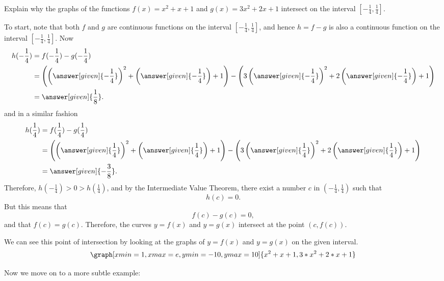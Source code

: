 \documentclass{ximera}
\begin{document}
\begin{example}
  Explain why the graphs of the functions $f(x) = x^2+x+1$  and $ g(x) = 3x^2+2x+1$ intersect on the interval $[-\frac14,\frac14]$.

  To start, note that both $f$ and $g$ are continuous functions on the interval $[-\frac14,\frac14]$, and
  hence $h = f-g$ is also a continuous function on the interval $[-\frac14,\frac14]$. Now
  \begin{align*}
    h(-\frac14) &= f(-\frac14) - g(-\frac14) \\
    &= \left(\left(\answer[given]{-\frac14}\right)^2 + \left(\answer[given]{-\frac14}\right)+1\right)
      - \left( 3\left(\answer[given]{-\frac14}\right)^2+2\left(\answer[given]{-\frac14}\right)+1 \right)\\
    &= \answer[given]{\frac18}.
  \end{align*}
  and in a similar fashion
  \begin{align*}
    h(\frac14) &= f(\frac14) - g(\frac14) \\
    &= \left(\left(\answer[given]{\frac14}\right)^2 + \left(\answer[given]{\frac14}\right)+1\right)
      - \left( 3\left(\answer[given]{\frac14}\right)^2+2\left(\answer[given]{\frac14}\right)+1 \right)\\
    &= \answer[given]{-\frac38}.
  \end{align*}
   Therefore, $h(-\frac14)>0>h(\frac14)$, and by the Intermediate Value Theorem, there exist a number $c$ in $(-\frac14,\frac14)$ such that
  \[
  h(c)=0.
  \]
    But this means that
    \[
 f(c)-g(c)=0,
  \]
  and that $f(c)=g(c)$.
  Therefore, the curves $y=f(x)$ and $y=g(x)$ intersect at the point $(c,f(c))$.

   \begin{onlineOnly}
   We can see this point of intersection by looking at the graphs of $y=f(x)$ and $y=g(x)$ on the given interval.
   \[
   \graph[xmin=1,xmax=e,ymin=-10,ymax=10]{x^2+x+1,3*x^2+2*x+1}
   \]
   \end{onlineOnly}

\end{example}
Now we move on to a more subtle example:
\end{document}
